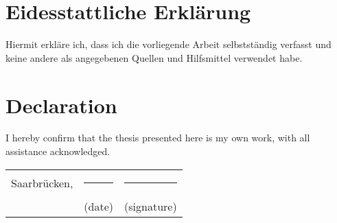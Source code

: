 \section*{Eidesstattliche Erklärung}

Hiermit erkläre ich, dass ich die vorliegende Arbeit selbstständig verfasst und keine andere als angegebenen Quellen und Hilfsmittel verwendet habe.

{\renewcommand{\clearpage}{}
\section*{Declaration}

I hereby confirm that the thesis presented here is my own work, with all assistance acknowledged.

\vspace{.5in}
\begin{tabular}{lll}
    Saarbrücken, & \rule{1in}{.4pt} & \rule{2in}{.4pt} \\
     & (date) & (signature)
\end{tabular}

}
